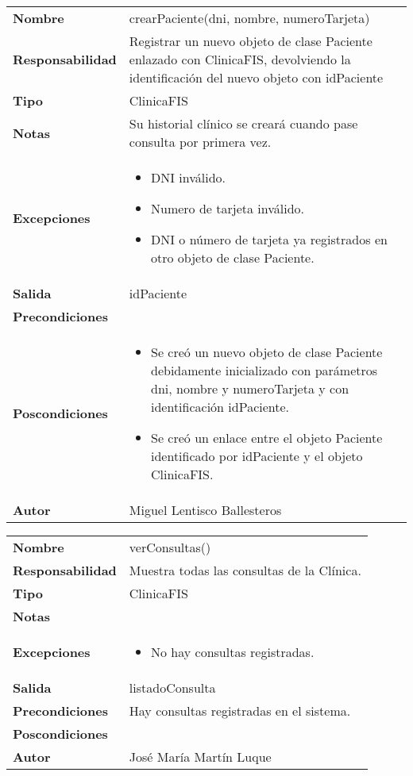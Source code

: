 \documentclass[11pt,a4paper]{article}
\newenvironment{itemizenomargins}
    {\begin{minipage}[t]{1\linewidth}\begin{itemize}}
    {\end{itemize}\end{minipage}}
\begin{document}
\begin{table}[H]
	\centering
	\label{my-label}
	\begin{tabularx}{\textwidth}{l|X}
		\textbf{Nombre}          & crearPaciente(dni, nombre, numeroTarjeta)\\
		\textbf{Responsabilidad} &  Registrar un nuevo objeto de clase Paciente enlazado con ClinicaFIS, devolviendo la identificación del nuevo objeto con idPaciente\\
		\textbf{Tipo}            & ClinicaFIS \\
		\textbf{Notas}           &  Su historial clínico se creará cuando pase consulta por primera vez. \\
		\textbf{Excepciones}     &  
			\begin{itemizenomargins}
				\item DNI inválido.
				\item Numero de tarjeta inválido.
				\item DNI o número de tarjeta ya registrados en otro objeto de clase Paciente.
			\end{itemizenomargins}		\\
		\textbf{Salida}          &  idPaciente \\
		\textbf{Precondiciones}  &  \\
		\textbf{Poscondiciones}  & 
			\begin{itemizenomargins}
				\item Se creó un nuevo objeto de clase Paciente debidamente inicializado con parámetros dni, nombre y numeroTarjeta y con identificación idPaciente.
				\item Se creó un enlace entre el objeto Paciente identificado por idPaciente y el objeto ClinicaFIS.
			\end{itemizenomargins} \\
		\textbf{Autor}			 & Miguel Lentisco Ballesteros
	\end{tabularx}
\end{table}

\begin{table}[H]
	\centering
	\label{my-label}
	\begin{tabularx}{\textwidth}{l|X}
    \textbf{Nombre}          & verConsultas()\\
		\textbf{Responsabilidad} & Muestra todas las consultas de la Clínica. \\
		\textbf{Tipo}            & ClinicaFIS \\
		\textbf{Notas}           &  \\
		\textbf{Excepciones}     &
		\begin{itemizenomargins}
			\item No hay consultas registradas.
		\end{itemizenomargins} \\
		\textbf{Salida}          &  listadoConsulta\\
		\textbf{Precondiciones}  &  Hay consultas registradas en el sistema.\\
		\textbf{Poscondiciones}  & \\  
		\textbf{Autor}			 & José María Martín Luque
	\end{tabularx}
\end{table}
\end{document}
